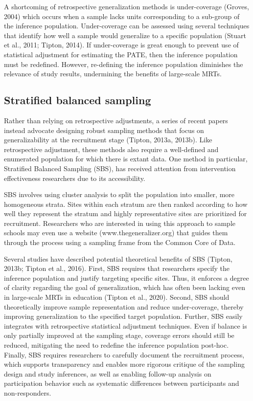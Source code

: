 \documentclass[
  english,
  man,floatsintext]{apa6}
\begin{document}
A shortcoming of retrospective generalization methods is under-coverage (Groves, 2004) which occurs when a sample lacks units corresponding to a sub-group of the inference population. Under-coverage can be assessed using several techniques that identify how well a sample would generalize to a specific population (Stuart et al., 2011; Tipton, 2014). If under-coverage is great enough to prevent use of statistical adjustment for estimating the PATE, then the inference population must be redefined. However, re-defining the inference population diminishes the relevance of study results, undermining the benefits of large-scale MRTs.

\hypertarget{stratified-balanced-sampling}{%
\subsection{Stratified balanced sampling}\label{stratified-balanced-sampling}}

Rather than relying on retrospective adjustments, a series of recent papers instead advocate designing robust sampling methods that focus on generalizability at the recruitment stage (Tipton, 2013a, 2013b). Like retrospective adjustment, these methods also require a well-defined and enumerated population for which there is extant data.
One method in particular, Stratified Balanced Sampling (SBS), has received attention from intervention effectiveness researchers due to its accessibility.

SBS involves using cluster analysis to split the population into smaller, more homogeneous strata. Sites within each stratum are then ranked according to how well they represent the stratum and highly representative sites are prioritized for recruitment.
Researchers who are interested in using this approach to sample schools may even use a website (www.thegeneralizer.org) that guides them through the process using a sampling frame from the Common Core of Data.

Several studies have described potential theoretical benefits of SBS (Tipton, 2013b; Tipton et al., 2016). First, SBS requires that researchers specify the inference population and justify targeting specific sites. Thus, it enforces a degree of clarity regarding the goal of generalization, which has often been lacking even in large-scale MRTs in education (Tipton et al., 2020). Second, SBS should theoretically improve sample representation and reduce under-coverage, thereby improving generalization to the specified target population. Further, SBS easily integrates with retrospective statistical adjustment techniques. Even if balance is only partially improved at the sampling stage, coverage errors should still be reduced, mitigating the need to redefine the inference population post-hoc.
Finally, SBS requires researchers to carefully document the recruitment process, which supports transparency and enables more rigorous critique of the sampling design and study inferences, as well as enabling follow-up analysis on participation behavior such as systematic differences between participants and non-responders.
\end{document}
